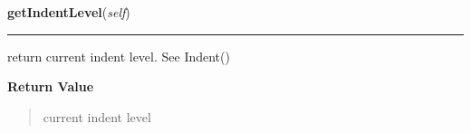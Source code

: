     \label{tracetool:TraceToSend:getIndentLevel}

    \vspace{0.5ex}

\hspace{.8\funcindent}\begin{boxedminipage}{\funcwidth}

    \raggedright \textbf{getIndentLevel}(\textit{self})

    \vspace{-1.5ex}

    \rule{\textwidth}{0.5\fboxrule}
\setlength{\parskip}{2ex}
    return current indent level. See Indent()

\setlength{\parskip}{1ex}
      \textbf{Return Value}
    \vspace{-1ex}

      \begin{quote}
      current indent level

      \end{quote}

    \end{boxedminipage}

    \label{tracetool:TraceToSend:indent}

    \vspace{0.5ex}

